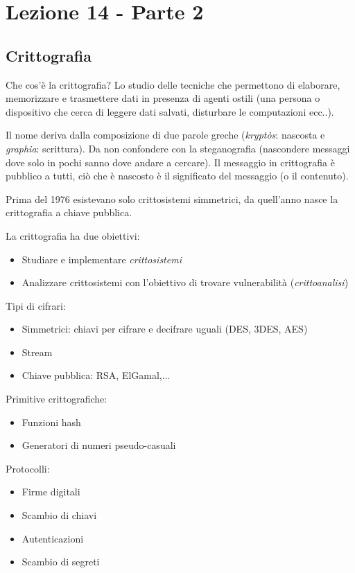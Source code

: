 \section*{Lezione 14 - Parte 2}

\subsection*{Crittografia}

Che cos'è la crittografia? Lo studio delle tecniche che permettono di elaborare, memorizzare e trasmettere dati in presenza di agenti ostili (una persona o dispositivo che cerca di leggere dati salvati, disturbare le computazioni ecc..).

Il nome deriva dalla composizione di due parole greche (\textit{kryptòs}: nascosta e \textit{graphia}: scrittura).
Da non confondere con la steganografia (nascondere messaggi dove solo in pochi sanno dove andare a cercare).
Il messaggio in crittografia è pubblico a tutti, ciò che è nascosto è il significato del messaggio (o il contenuto).

Prima del 1976 esistevano solo crittosistemi simmetrici, da quell'anno nasce la crittografia a chiave pubblica.


La crittografia ha due obiettivi:
\begin{itemize}
	\item Studiare e implementare \textit{crittosistemi}
	\item Analizzare crittosistemi con l'obiettivo di trovare vulnerabilità (\textit{crittoanalisi})
\end{itemize}

Tipi di cifrari:
\begin{itemize}
	\item Simmetrici: chiavi per cifrare e decifrare uguali (DES, 3DES, AES)
	\item Stream
	\item Chiave pubblica: RSA, ElGamal,...
\end{itemize}

Primitive crittografiche:
\begin{itemize}
	\item Funzioni hash
	\item Generatori di numeri pseudo-casuali
\end{itemize}

Protocolli:
\begin{itemize}
	\item Firme digitali
	\item Scambio di chiavi
	\item Autenticazioni
	\item Scambio di segreti
\end{itemize}


